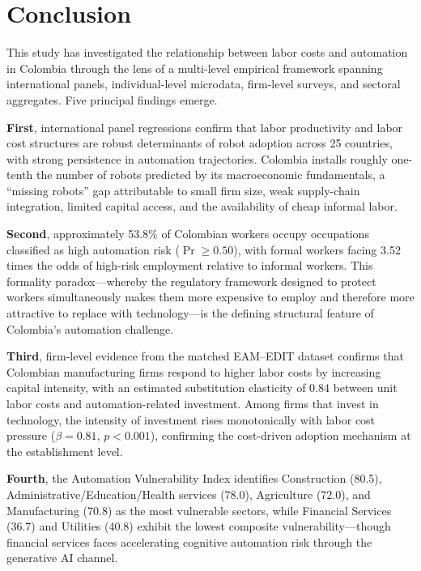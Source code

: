 \documentclass{article}
\begin{document}
\section{Conclusion}
\label{sec:conclusion}

This study has investigated the relationship between labor costs and automation in Colombia through the lens of a multi-level empirical framework spanning international panels, individual-level microdata, firm-level surveys, and sectoral aggregates. Five principal findings emerge.

\textbf{First}, international panel regressions confirm that labor productivity and labor cost structures are robust determinants of robot adoption across 25 countries, with strong persistence in automation trajectories. Colombia installs roughly one-tenth the number of robots predicted by its macroeconomic fundamentals, a ``missing robots'' gap attributable to small firm size, weak supply-chain integration, limited capital access, and the availability of cheap informal labor.

\textbf{Second}, approximately 53.8\% of Colombian workers occupy occupations classified as high automation risk ($\Pr \geq 0.50$), with formal workers facing 3.52 times the odds of high-risk employment relative to informal workers. This formality paradox---whereby the regulatory framework designed to protect workers simultaneously makes them more expensive to employ and therefore more attractive to replace with technology---is the defining structural feature of Colombia's automation challenge.

\textbf{Third}, firm-level evidence from the matched EAM--EDIT dataset confirms that Colombian manufacturing firms respond to higher labor costs by increasing capital intensity, with an estimated substitution elasticity of 0.84 between unit labor costs and automation-related investment. Among firms that invest in technology, the intensity of investment rises monotonically with labor cost pressure ($\beta = 0.81$, $p < 0.001$), confirming the cost-driven adoption mechanism at the establishment level.

\textbf{Fourth}, the Automation Vulnerability Index identifies Construction (80.5), Administrative/Education/Health services (78.0), Agriculture (72.0), and Manufacturing (70.8) as the most vulnerable sectors, while Financial Services (36.7) and Utilities (40.8) exhibit the lowest composite vulnerability---though financial services faces accelerating cognitive automation risk through the generative AI channel.
\end{document}
